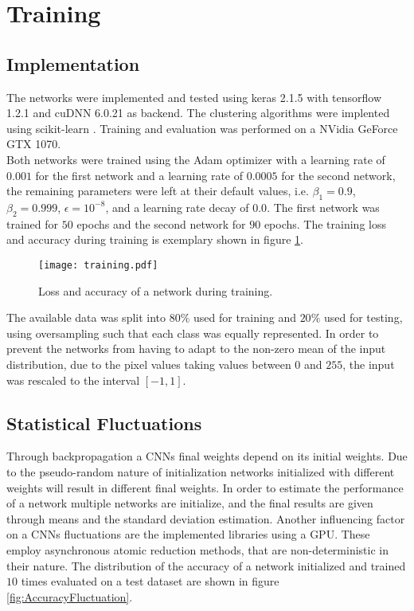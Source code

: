 \section{Training}

\subsection{Implementation}
The networks were implemented and tested using keras 2.1.5 \cite{chollet2015keras} with tensorflow 1.2.1 \cite{tensorflow2015-whitepaper} and cuDNN 6.0.21 \cite{Chetlur2014} as backend. The clustering algorithms were implented using scikit-learn \cite{scikit-learn}. Training and evaluation was performed on a NVidia GeForce GTX 1070.\\

Both networks were trained using the Adam optimizer with a learning rate of $0.001$ for the first network and a learning rate of $0.0005$ for the second network, the remaining parameters were left at their default values, i.e. $\beta_1=0.9$, $\beta_2=0.999$, $\epsilon=10^{-8}$, and a learning rate decay of $0.0$. The first network was trained for $50$ epochs and the second network for $90$ epochs. The training loss and accuracy during training is exemplary shown in figure \ref{fig:Training}. \\

\begin{figure}
\centering
\texttt{[image: training.pdf]}
\caption{Loss and accuracy of a network during training.}
\label{fig:Training}
\end{figure}

The available data was split into $80\%$ used for training and $20\%$ used for testing, using oversampling such that each class was equally represented. In order to prevent the networks from having to adapt to the non-zero mean of the input distribution, due to the pixel values taking values between $0$ and $255$, the input was rescaled to the interval $[-1,1]$. \\

\subsection{Statistical Fluctuations}

Through backpropagation a CNNs final weights depend on its initial weights. Due to the pseudo-random nature of initialization networks initialized with different weights will result in different final weights. In order to estimate the performance of a network multiple networks are initialize, and the final results are given through means and the standard deviation estimation. Another influencing factor on a CNNs fluctuations are the implemented libraries using a GPU. These employ asynchronous atomic reduction methods, that are non-deterministic in their nature. The distribution of the accuracy of a network initialized and trained $10$ times evaluated on a test dataset are shown in figure \ref{fig:AccuracyFluctuation}.

